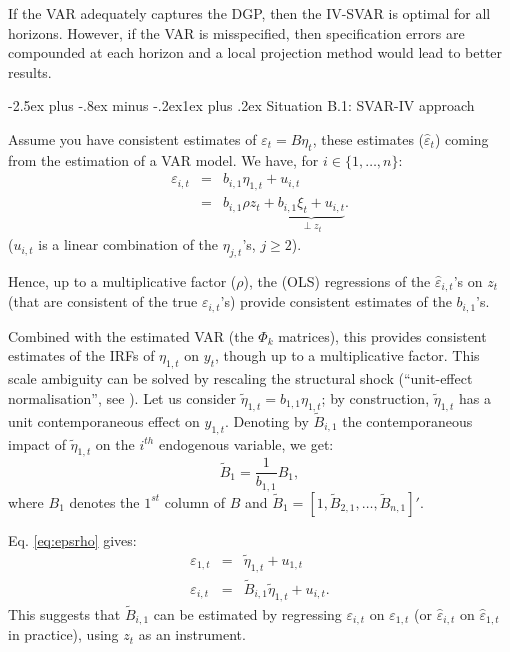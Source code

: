 \documentclass[
  11pt,
]{book}
\makeatletter
\renewcommand\subsection{\@startsection{subsection}{2}{\z@}
  {-2.5ex plus -.8ex minus -.2ex}{1ex plus .2ex}
  {\normalfont\large\bfseries\color{TextbookInk}}}
\theoremstyle{definition}
\theoremstyle{definition}
\theoremstyle{definition}
\theoremstyle{definition}
\theoremstyle{remark}
\makeatother
\begin{document}
If the VAR adequately captures the DGP, then the IV-SVAR is optimal for all horizons. However, if the VAR is misspecified, then specification errors are compounded at each horizon and a local projection method would lead to better results.

\subsection{Situation B.1: SVAR-IV approach}\label{SVARIVa}

Assume you have consistent estimates of \(\varepsilon_t = B\eta_t\), these estimates (\(\hat\varepsilon_{t}\)) coming from the estimation of a VAR model. We have, for \(i \in \{1,\dots,n\}\):
\begin{eqnarray}
\varepsilon_{i,t} &=& b_{i,1} \eta_{1,t} + u_{i,t} \label{eq:epsrho}\\
&=& b_{i,1} \rho z_t + \underbrace{b_{i,1}\xi_t + u_{i,t}}_{\perp z_t}. \nonumber
\end{eqnarray}
(\(u_{i,t}\) is a linear combination of the \(\eta_{j,t}\)'s, \(j\ge2\)).

Hence, up to a multiplicative factor (\(\rho\)), the (OLS) regressions of the \(\hat\varepsilon_{i,t}\)'s on \(z_t\) (that are consistent of the true \(\varepsilon_{i,t}\)'s) provide consistent estimates of the \(b_{i,1}\)'s.

Combined with the estimated VAR (the \(\Phi_k\) matrices), this provides consistent estimates of the IRFs of \(\eta_{1,t}\) on \(y_t\), though up to a multiplicative factor. This scale ambiguity can be solved by rescaling the structural shock (``unit-effect normalisation'', see \citet{Stock_Watson_2018}). Let us consider \(\tilde\eta_{1,t}=b_{1,1}\eta_{1,t}\); by construction, \(\tilde\eta_{1,t}\) has a unit contemporaneous effect on \(y_{1,t}\). Denoting by \(\tilde{B}_{i,1}\) the contemporaneous impact of \(\tilde\eta_{1,t}\) on the \(i^{th}\) endogenous variable, we get:
\[
\tilde{B}_{1} = \frac{1}{b_{1,1}} {B}_{1},
\]
where \(B_{1}\) denotes the \(1^{st}\) column of \(B\) and \(\tilde{B}_{1}=[1,\tilde{B}_{2,1},\dots,\tilde{B}_{n,1}]'\).

Eq. \eqref{eq:epsrho} gives:
\begin{eqnarray*}
\varepsilon_{1,t} &=& \tilde\eta_{1,t} + u_{1,t}\\
\varepsilon_{i,t} &=& \tilde{B}_{i,1} \tilde\eta_{1,t} + u_{i,t}.
\end{eqnarray*}
This suggests that \(\tilde{B}_{i,1}\) can be estimated by regressing \(\varepsilon_{i,t}\) on \(\varepsilon_{1,t}\) (or \(\hat\varepsilon_{i,t}\) on \(\hat\varepsilon_{1,t}\) in practice), using \(z_t\) as an instrument.
\end{document}
